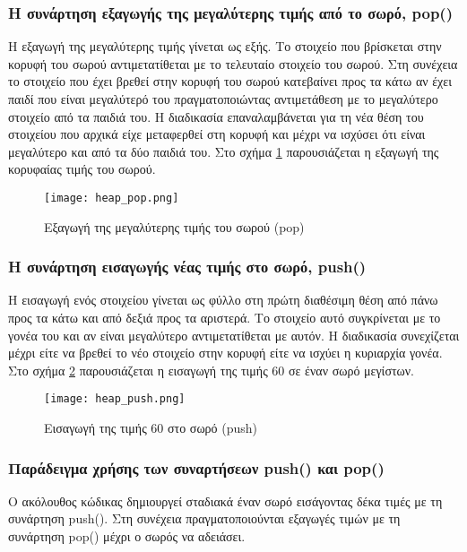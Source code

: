 \subsubsection*{Η συνάρτηση εξαγωγής της μεγαλύτερης τιμής από το σωρό, pop()}
Η εξαγωγή της μεγαλύτερης τιμής γίνεται ως εξής. Το στοιχείο που βρίσκεται στην κορυφή του σωρού αντιμετατίθεται με το τελευταίο στοιχείο του σωρού. Στη συνέχεια το στοιχείο που έχει βρεθεί στην κορυφή του σωρού κατεβαίνει προς τα κάτω αν έχει παιδί που είναι μεγαλύτερό του πραγματοποιώντας αντιμετάθεση με το μεγαλύτερο στοιχείο από τα παιδιά του. Η διαδικασία επαναλαμβάνεται για τη νέα θέση του στοιχείου που αρχικά είχε μεταφερθεί στη κορυφή και μέχρι να ισχύσει ότι είναι μεγαλύτερο και από τα δύο παιδιά του. Στο σχήμα \ref{fig:heap_pop} παρουσιάζεται η εξαγωγή της κορυφαίας τιμής του σωρού.

\begin{figure}[ht!]
\centering
\texttt{[image: heap\_pop.png]}
\caption{Εξαγωγή της μεγαλύτερης τιμής του σωρού (pop)}
\label{fig:heap_pop}
\end{figure}

\subsubsection*{Η συνάρτηση εισαγωγής νέας τιμής στο σωρό, push()}
Η εισαγωγή ενός στοιχείου γίνεται ως φύλλο στη πρώτη διαθέσιμη θέση από πάνω προς τα κάτω και από δεξιά προς τα αριστερά. Το στοιχείο αυτό συγκρίνεται με το γονέα του και αν είναι μεγαλύτερο αντιμετατίθεται με αυτόν. Η διαδικασία συνεχίζεται μέχρι είτε να βρεθεί το νέο στοιχείο στην κορυφή είτε να ισχύει η κυριαρχία γονέα. Στο σχήμα \ref{fig:heap_push} παρουσιάζεται η εισαγωγή της τιμής 60 σε έναν σωρό μεγίστων.

\begin{figure}[H]
\centering
\texttt{[image: heap\_push.png]}
\caption{Εισαγωγή της τιμής 60 στο σωρό (push)}
\label{fig:heap_push}
\end{figure}


\subsubsection*{Παράδειγμα χρήσης των συναρτήσεων push() και pop()}
Ο ακόλουθος κώδικας δημιουργεί σταδιακά έναν σωρό εισάγοντας δέκα τιμές με τη συνάρτηση push(). Στη συνέχεια πραγματοποιούνται εξαγωγές τιμών με τη συνάρτηση pop() μέχρι ο σωρός να αδειάσει.




